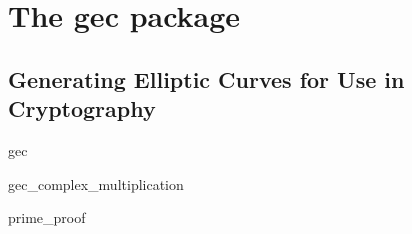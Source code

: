 %
%
%

\part*{The \LiDIA gec package}\label{LiDIA-GEC}

\chapter{Generating Elliptic Curves for Use in Cryptography}

\begin{class}{gec}
  
\end{class}

\begin{class}{gec_complex_multiplication}
  
\end{class}

\begin{class}{prime_proof}
  
\end{class}



